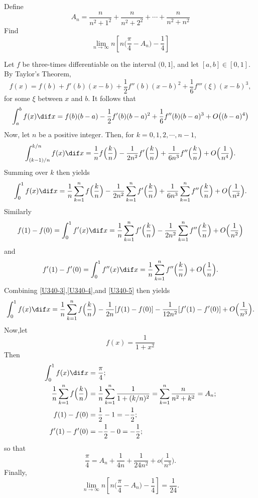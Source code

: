 \documentclass[color=green,titlestyle=hang]{elegantbook}%
\begin{document}
\begin{example}
Define 
\[A_n=\frac{n}{n^2+1^2}+\frac{n}{n^2+2^2}+\cdots+\frac{n}{n^2+n^2}\]
Find \[\lim_{n\to\infty}n\left[n\Big(\frac{\pi}{4}-A_n\Big)-\frac{1}{4}\right]\]
\end{example}\begin{solution}
Let $f$ be three-times differentiable on the interval $(0,1]$, and let $[a,b]\in[0,1]$. By Taylor's Theorem,
\[f(x)=f(b)+f'(b)(x-b)+\frac{1}{2}f''(b)(x-b)^2+\frac{1}{6}f'''(\xi)(x-b)^3,\]
for some $\xi$ between $x$ and $b$. It follows that
\[\int_a^bf(x)\dif x=f(b)(b-a)-\frac{1}{2}f'(b)(b-a)^2+\frac{1}{6}f''(b)(b-a)^3+O\big((b-a)^4\big) \]
Now, let $n$ be a positive integer. Then, for $k=0,1,2,\cdots,n-1$,
\[\int_{(k-1)/n}^{k/n}f(x)\dif x=\frac{1}{n}f\Big(\frac{k}{n}\Big)-\frac{1}{2n^2}f'\Big(\frac{k}{n}\Big)+\frac{1}{6n^3}f''\Big(\frac{k}{n}\Big)+O\Big(\frac{1}{n^4}\Big).\]
Summing over $k$ then yields
\begin{equation}\label{U340-3}
\int_0^1f(x)\dif x=\frac{1}{n}\sum_{k=1}^{n}f\Big(\frac{k}{n}\Big)-\frac{1}{2n^2}\sum_{k=1}^{n}f'\Big(\frac{k}{n}\Big)+\frac{1}{6n^3}\sum_{k=1}^{n}f''\Big(\frac{k}{n}\Big)+O\Big(\frac{1}{n^2}\Big).
\end{equation}
Similarly
\begin{equation}\label{U340-4}
f(1)-f(0)=\int_0^1f'(x)\dif x=\frac{1}{n}\sum_{k=1}^{n}f'\Big(\frac{k}{n}\Big)-\frac{1}{2n^2}\sum_{k=1}^{n}f''\Big(\frac{k}{n}\Big)+O\Big(\frac{1}{n^2}\Big)
\end{equation}
and
\begin{equation}\label{U340-5}
f'(1)-f'(0)=\int_0^1f''(x)\dif x=\frac{1}{n}\sum_{k=1}^{n}f''\Big(\frac{k}{n}\Big)+O\Big(\frac{1}{n}\Big).
\end{equation}
Combining \eqref{U340-3},\eqref{U340-4},and \eqref{U340-5} then yields
\[\int_0^1f(x)\dif x=\frac{1}{n}\sum_{k=1}^{n}f\Big(\frac{k}{n}\Big)-\frac{1}{2n}[f(1)-f(0)]-\frac{1}{12n^2}[f'(1)-f'(0)]+O\Big(\frac{1}{n^3}\Big). \]
Now,let
\[f(x)=\frac{1}{1+x^2}\]
Then
\begin{align*}
\int_0^1f(x)\dif x&=\frac{\pi}{4};\\
\frac{1}{n}\sum_{k=1}^{n}f\Big(\frac{k}{n}\Big)&=\frac{1}{n}\sum_{k=1}^{n}\frac{1}{1+(k/n)^2}=\sum_{k=1}^{n}\frac{n}{n^2+k^2}=A_n;\\
f(1)-f(0)&=\frac{1}{2}-1=-\frac{1}{2};\\
f'(1)-f'(0)&=-\frac{1}{2}-0=-\frac{1}{2};
\end{align*}
so that
\[\frac{\pi}{4}=A_n+\frac{1}{4n}+\frac{1}{24n^2}+o\Big(\frac{1}{n^3}\Big).\]
Finally,
\[\lim_{n\to\infty}n\left[n\Big(\frac{\pi}{4}-A_n\Big)-\frac{1}{4}\right]=\frac{1}{24}.\]
\end{solution}
\end{document}
